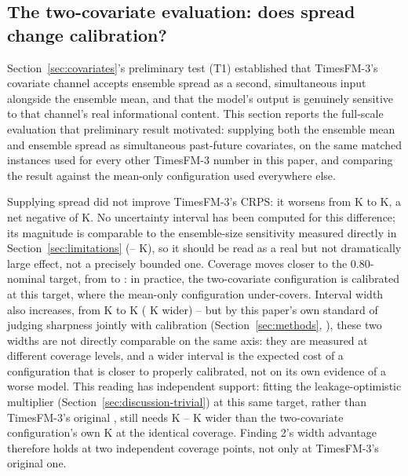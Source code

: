 \subsection{The two-covariate evaluation: does spread change calibration?}
\label{sec:discussion-covariate-check}

Section~\ref{sec:covariates}'s preliminary test (T1) established that
TimesFM-3's covariate channel accepts ensemble spread as a second,
simultaneous input alongside the ensemble mean, and that the model's
output is genuinely sensitive to that channel's real informational
content. This section reports the full-scale evaluation that
preliminary result motivated: supplying both the ensemble mean and
ensemble spread as simultaneous past-future covariates, on the same
\NMatchedInstances{} matched instances used for every other TimesFM-3
number in this paper, and comparing the result against the mean-only
configuration used everywhere else.

Supplying spread did not improve TimesFM-3's CRPS: it worsens from
\CrpsTsfmFull{} K to \CrpsTsfmTwoCov{} K, a net negative of
\CrpsTwoCovDiff{} K. No uncertainty interval has been computed for this
difference; its magnitude is comparable to the ensemble-size sensitivity
measured directly in Section~\ref{sec:limitations}
(\EnsSubsampleCrpsDiffPooled{}--\EnsSubsampleCrpsDiffLocal{} K), so it
should be read as a real but not dramatically large effect, not a
precisely bounded one. Coverage moves closer to the 0.80-nominal target,
from \CoverageTsfmFull{} to \CoverageTsfmTwoCov{}: in practice, the
two-covariate configuration is calibrated at this target, where the
mean-only configuration under-covers. Interval width also increases,
from \WidthTsfmFull{} K to \WidthTsfmTwoCov{} K (\WidthTwoCovDiff{} K
wider) -- but by this paper's own standard of judging sharpness jointly
with calibration (Section~\ref{sec:methods},
\citealp{gneiting_2007_calibration_sharpness}), these two widths are not
directly comparable on the same axis: they are measured at different
coverage levels, and a wider interval is the expected cost of a
configuration that is closer to properly calibrated, not on its own
evidence of a worse model. This reading has independent support: fitting
the leakage-optimistic multiplier (Section~\ref{sec:discussion-trivial})
at this same \CoverageTsfmTwoCov{} target, rather than TimesFM-3's
original \CoverageTsfmFull{}, still needs \LeakyWidthAtTwoCovCoverage{}
K -- \LeakyWidthAtTwoCovCoverageDiff{} K wider than the two-covariate
configuration's own \WidthTsfmTwoCov{} K at the identical coverage.
Finding 2's width advantage therefore holds at two independent coverage
points, not only at TimesFM-3's original one.

